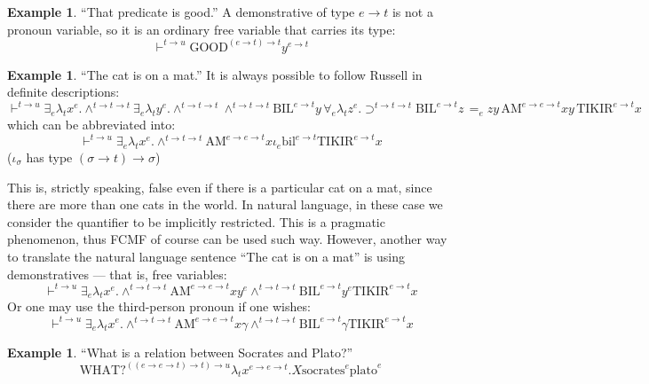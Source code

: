 \documentclass[11pt,a4paper]{article}
\theoremstyle{definition}
\newtheorem{example}[definition]{Example}
\theoremstyle{plain}
\begin{document}
\begin{example}
``That predicate is good.'' A demonstrative of type $e\to t$ is not a pronoun variable, so it is an ordinary free variable that carries its type:
\[
\vdash^{t\to u} \text{GOOD}^{(e\to t)\to t} y^{e\to t}
\]
\end{example}

\begin{example}
``The cat is on a mat.'' It is always possible to follow Russell in definite descriptions:
\[
\vdash^{t\to u} \exists_e \lambda_t x^e. \land^{t\to t\to t} \exists_e \lambda_t y^e. \land^{t\to t\to t} \land^{t\to t\to t} \text{BIL}^{e\to t} y \, \forall_e \lambda_t z^e. \supset^{t\to t\to t} \text{BIL}^{e\to t} z \, {=_e} z y \, \text{AM}^{e\to e\to t} x y \, \text{TIKIR}^{e\to t} x
\]
which can be abbreviated into:
\[
\vdash^{t\to u} \exists_e\lambda_t x^e.\land^{t\to t\to t} \text{AM}^{e\to e\to t}x\iota_e\text{bil}^{e\to t}\text{TIKIR}^{e\to t}x
\]
($\iota_\sigma$ has type $(\sigma \to t)\to\sigma$)

This is, strictly speaking, false even if there is a particular cat on a mat, since there are more than one cats in the world. In natural language, in these case we consider the quantifier to be implicitly restricted. This is a pragmatic phenomenon, thus FCMF of course can be used such way. However, another way to translate the natural language sentence ``The cat is on a mat'' is using demonstratives --- that is, free variables:
\[
\vdash^{t\to u} \exists_e \lambda_t x^e. \land^{t\to t\to t} \text{AM}^{e\to e\to t}xy^e \land^{t\to t\to t}\text{BIL}^{e\to t}y^e\text{TIKIR}^{e\to t}x
\]
Or one may use the third-person pronoun if one wishes:
\[
\vdash^{t\to u} \exists_e \lambda_t x^e. \land^{t\to t\to t} \text{AM}^{e\to e\to t}x\gamma \land^{t\to t\to t}\text{BIL}^{e\to t}\gamma\text{TIKIR}^{e\to t}x
\]
\end{example}

\begin{example}
  ``What is a relation between Socrates and Plato?''
  \[ \text{WHAT}?^{((e\to e\to t) \to t) \to u} \lambda_t x^{e\to e\to t}. X\text{socrates}^e\text{plato}^e 
  \]
\end{example}
\end{document}

